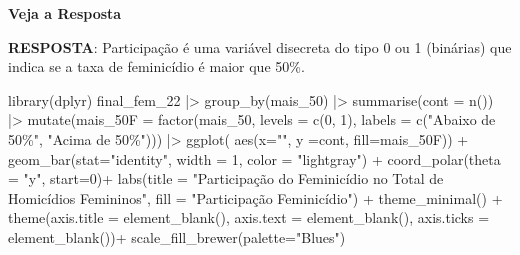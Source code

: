 \documentclass[
  letterpaper,
  DIV=11,
  numbers=noendperiod]{scrreprt}
\newenvironment{Shaded}{\begin{snugshade}}{\end{snugshade}}
\newcommand{\AttributeTok}[1]{\textcolor[rgb]{0.40,0.45,0.13}{#1}}
\newcommand{\DecValTok}[1]{\textcolor[rgb]{0.68,0.00,0.00}{#1}}
\newcommand{\FunctionTok}[1]{\textcolor[rgb]{0.28,0.35,0.67}{#1}}
\newcommand{\NormalTok}[1]{\textcolor[rgb]{0.00,0.23,0.31}{#1}}
\newcommand{\SpecialCharTok}[1]{\textcolor[rgb]{0.37,0.37,0.37}{#1}}
\newcommand{\StringTok}[1]{\textcolor[rgb]{0.13,0.47,0.30}{#1}}
\begin{document}
\begin{tcolorbox}[enhanced jigsaw, colframe=quarto-callout-warning-color-frame, opacityback=0, breakable, leftrule=.75mm, toprule=.15mm, arc=.35mm, rightrule=.15mm, bottomrule=.15mm, left=2mm, colback=white]
\begin{minipage}[t]{5.5mm}
\textcolor{quarto-callout-warning-color}{\faExclamationTriangle}
\end{minipage}%
\begin{minipage}[t]{\textwidth - 5.5mm}

\vspace{-3mm}\textbf{Veja a Resposta}\vspace{3mm}

\textbf{RESPOSTA}: Participação é uma variável disecreta do tipo 0 ou 1
(binárias) que indica se a taxa de feminicídio é maior que 50\%.

\begin{Shaded}
\begin{Highlighting}[]
\FunctionTok{library}\NormalTok{(dplyr)}
\NormalTok{final\_fem\_22 }\SpecialCharTok{|\textgreater{}} 
  \FunctionTok{group\_by}\NormalTok{(mais\_50) }\SpecialCharTok{|\textgreater{}}
  \FunctionTok{summarise}\NormalTok{(}\AttributeTok{cont =} \FunctionTok{n}\NormalTok{()) }\SpecialCharTok{|\textgreater{}} 
  \FunctionTok{mutate}\NormalTok{(}\AttributeTok{mais\_50F =} \FunctionTok{factor}\NormalTok{(mais\_50, }\AttributeTok{levels =} \FunctionTok{c}\NormalTok{(}\DecValTok{0}\NormalTok{, }\DecValTok{1}\NormalTok{), }\AttributeTok{labels =} \FunctionTok{c}\NormalTok{(}\StringTok{"Abaixo de 50\%"}\NormalTok{, }\StringTok{"Acima de 50\%"}\NormalTok{))) }\SpecialCharTok{|\textgreater{}} 
  \FunctionTok{ggplot}\NormalTok{( }\FunctionTok{aes}\NormalTok{(}\AttributeTok{x=}\StringTok{""}\NormalTok{, }\AttributeTok{y =}\NormalTok{cont, }\AttributeTok{fill=}\NormalTok{mais\_50F)) }\SpecialCharTok{+}
  \FunctionTok{geom\_bar}\NormalTok{(}\AttributeTok{stat=}\StringTok{"identity"}\NormalTok{, }\AttributeTok{width =} \DecValTok{1}\NormalTok{, }\AttributeTok{color =} \StringTok{"lightgray"}\NormalTok{) }\SpecialCharTok{+}
  \FunctionTok{coord\_polar}\NormalTok{(}\AttributeTok{theta =} \StringTok{"y"}\NormalTok{, }\AttributeTok{start=}\DecValTok{0}\NormalTok{)}\SpecialCharTok{+}
  \FunctionTok{labs}\NormalTok{(}\AttributeTok{title =} \StringTok{"Participação do Feminicídio no Total de Homicídios Femininos"}\NormalTok{, }\AttributeTok{fill =} \StringTok{"Participação Feminicídio"}\NormalTok{) }\SpecialCharTok{+}
  \FunctionTok{theme\_minimal}\NormalTok{() }\SpecialCharTok{+}
  \FunctionTok{theme}\NormalTok{(}\AttributeTok{axis.title =} \FunctionTok{element\_blank}\NormalTok{(),}
        \AttributeTok{axis.text =} \FunctionTok{element\_blank}\NormalTok{(),}
        \AttributeTok{axis.ticks =} \FunctionTok{element\_blank}\NormalTok{())}\SpecialCharTok{+}
  \FunctionTok{scale\_fill\_brewer}\NormalTok{(}\AttributeTok{palette=}\StringTok{"Blues"}\NormalTok{)}
\end{Highlighting}
\end{Shaded}


\end{minipage}
\end{tcolorbox}
\end{document}
